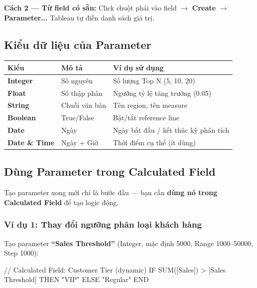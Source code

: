 \documentclass[12pt]{article}
\begin{document}
\noindent \textbf{Cách 2 --- Từ field có sẵn:} Click chuột phải vào field $\rightarrow$ \textbf{Create} $\rightarrow$ \textbf{Parameter...} Tableau tự điền danh sách giá trị.

\subsection{Kiểu dữ liệu của Parameter}

\begin{center}
\renewcommand{\arraystretch}{1.4}
\begin{tabularx}{\linewidth}{l X X}
\toprule
\textbf{Kiểu} & \textbf{Mô tả} & \textbf{Ví dụ sử dụng} \\
\midrule
\textbf{Integer} & Số nguyên & Số lượng Top N (5, 10, 20) \\
\textbf{Float} & Số thập phân & Ngưỡng tỷ lệ tăng trưởng (0.05) \\
\textbf{String} & Chuỗi văn bản & Tên region, tên measure \\
\textbf{Boolean} & True/False & Bật/tắt reference line \\
\textbf{Date} & Ngày & Ngày bắt đầu / kết thúc kỳ phân tích \\
\textbf{Date \& Time} & Ngày + Giờ & Thời điểm cụ thể (ít dùng) \\
\bottomrule
\end{tabularx}
\end{center}

\subsection{Dùng Parameter trong Calculated Field}

\noindent Tạo parameter xong mới chỉ là bước đầu --- bạn cần \textbf{dùng nó trong Calculated Field} để tạo logic động.

\subsubsection{Ví dụ 1: Thay đổi ngưỡng phân loại khách hàng}

\noindent Tạo parameter \textbf{``Sales Threshold''} (Integer, mặc định 5000, Range 1000--50000, Step 1000):

\begin{aivncodebox}[]
\begin{python}
// Calculated Field: Customer Tier (dynamic)
IF SUM([Sales]) > [Sales Threshold] THEN "VIP"
ELSE "Regular"
END
\end{python}
\end{aivncodebox}
\end{document}
